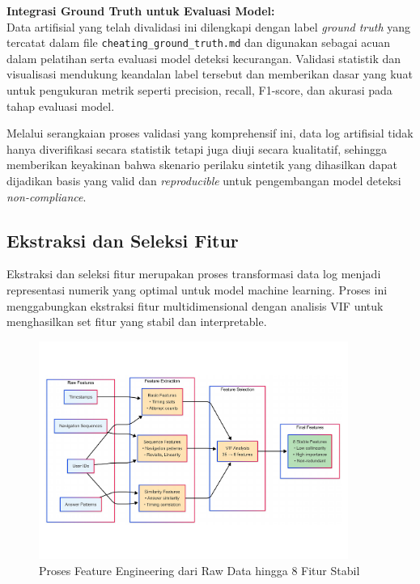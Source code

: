 \textbf{Integrasi Ground Truth untuk Evaluasi Model:} \\
Data artifisial yang telah divalidasi ini dilengkapi dengan label \textit{ground truth} yang tercatat dalam file \texttt{cheating\_ground\_truth.md} dan digunakan sebagai acuan dalam pelatihan serta evaluasi model deteksi kecurangan. Validasi statistik dan visualisasi mendukung keandalan label tersebut dan memberikan dasar yang kuat untuk pengukuran metrik seperti precision, recall, F1-score, dan akurasi pada tahap evaluasi model.

Melalui serangkaian proses validasi yang komprehensif ini, data log artifisial tidak hanya diverifikasi secara statistik tetapi juga diuji secara kualitatif, sehingga memberikan keyakinan bahwa skenario perilaku sintetik yang dihasilkan dapat dijadikan basis yang valid dan \textit{reproducible} untuk pengembangan model deteksi \textit{non-compliance}.

\subsection{Ekstraksi dan Seleksi Fitur}
\label{sec:featureEngineering}
Ekstraksi dan seleksi fitur merupakan proses transformasi data log menjadi representasi numerik yang optimal untuk model machine learning. Proses ini menggabungkan ekstraksi fitur multidimensional dengan analisis VIF untuk menghasilkan set fitur yang stabil dan interpretable. 

\begin{figure}[htbp]
    \centering
    \includegraphics[width=0.9\textwidth]{figures/feature_engineering_process.pdf}
    \caption{Proses Feature Engineering dari Raw Data hingga 8 Fitur Stabil}
    \label{fig:feature_engineering_process}
\end{figure}

